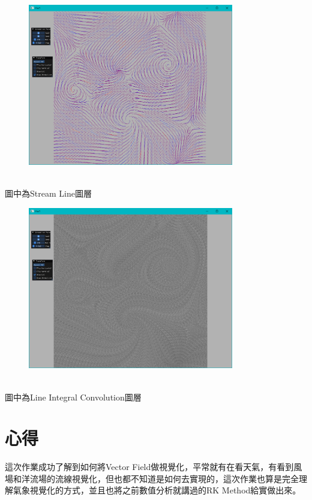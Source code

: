 \documentclass[a4paper,12pt]{article}
\begin{document}
\begin{figure}[H]
    \centering
    \includegraphics[width=0.8\textwidth]{img/img2.png}
\end{figure}\\
圖中為Stream Line圖層 \\

\begin{figure}[H]
    \centering
    \includegraphics[width=0.8\textwidth]{img/img3.png}
\end{figure}\\
圖中為Line Integral Convolution圖層



\section{心得}
    這次作業成功了解到如何將Vector Field做視覺化，平常就有在看天氣，有看到風場和洋流場的流線視覺化，但也都不知道是如何去實現的，這次作業也算是完全理解氣象視覺化的方式，並且也將之前數值分析就講過的RK Method給實做出來。
\end{document}

